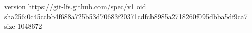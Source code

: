 version https://git-lfs.github.com/spec/v1
oid sha256:0c45ccbb4f688a725b53d70683f20371cdfcb8985a2718260f095dbba5df9ca7
size 1048672
